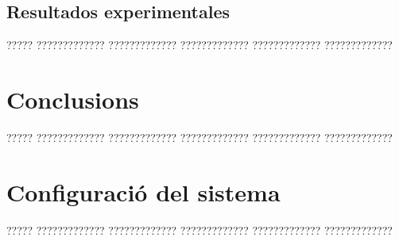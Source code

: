 \documentclass[11pt,spanish,listoffigures,listoftables]{tfgetsinf}
\begin{document}
\section{Resultados experimentales}

????? ????????????? ????????????? ????????????? ????????????? ?????????????


\chapter{Conclusions}

????? ????????????? ????????????? ????????????? ????????????? ????????????? 







\cleardoublepage


\APPENDIX


\chapter{Configuració del sistema}

????? ????????????? ????????????? ????????????? ????????????? ?????????????
\end{document}
